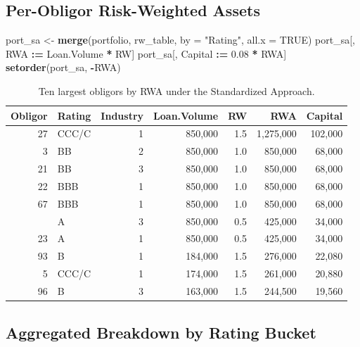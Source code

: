 \documentclass[
  11pt,
]{article}
\newenvironment{Shaded}{\begin{snugshade}}{\end{snugshade}}
\newcommand{\AttributeTok}[1]{\textcolor[rgb]{0.13,0.29,0.53}{#1}}
\newcommand{\ConstantTok}[1]{\textcolor[rgb]{0.56,0.35,0.01}{#1}}
\newcommand{\FloatTok}[1]{\textcolor[rgb]{0.00,0.00,0.81}{#1}}
\newcommand{\FunctionTok}[1]{\textcolor[rgb]{0.13,0.29,0.53}{\textbf{#1}}}
\newcommand{\NormalTok}[1]{#1}
\newcommand{\OtherTok}[1]{\textcolor[rgb]{0.56,0.35,0.01}{#1}}
\newcommand{\SpecialCharTok}[1]{\textcolor[rgb]{0.81,0.36,0.00}{\textbf{#1}}}
\newcommand{\StringTok}[1]{\textcolor[rgb]{0.31,0.60,0.02}{#1}}
\begin{document}
\subsection{Per-Obligor Risk-Weighted
Assets}\label{per-obligor-risk-weighted-assets}

\begin{Shaded}
\begin{Highlighting}[]
\NormalTok{port\_sa }\OtherTok{\textless{}{-}} \FunctionTok{merge}\NormalTok{(portfolio, rw\_table, }\AttributeTok{by =} \StringTok{"Rating"}\NormalTok{, }\AttributeTok{all.x =} \ConstantTok{TRUE}\NormalTok{)}
\NormalTok{port\_sa[, RWA     }\SpecialCharTok{:=}\NormalTok{ Loan.Volume }\SpecialCharTok{*}\NormalTok{ RW]}
\NormalTok{port\_sa[, Capital }\SpecialCharTok{:=} \FloatTok{0.08} \SpecialCharTok{*}\NormalTok{ RWA]}
\FunctionTok{setorder}\NormalTok{(port\_sa, }\SpecialCharTok{{-}}\NormalTok{RWA)}
\end{Highlighting}
\end{Shaded}

\begin{longtable}[t]{rlrrrrr}
\caption{\label{tab:task2-top10}Ten largest obligors by RWA under the Standardized Approach.}\\
\toprule
Obligor & Rating & Industry & Loan.Volume & RW & RWA & Capital\\
\midrule
27 & CCC/C & 1 & 850,000 & 1.5 & 1,275,000 & 102,000\\
3 & BB & 2 & 850,000 & 1.0 & 850,000 & 68,000\\
21 & BB & 3 & 850,000 & 1.0 & 850,000 & 68,000\\
22 & BBB & 1 & 850,000 & 1.0 & 850,000 & 68,000\\
67 & BBB & 1 & 850,000 & 1.0 & 850,000 & 68,000\\
\addlinespace
13 & A & 3 & 850,000 & 0.5 & 425,000 & 34,000\\
23 & A & 1 & 850,000 & 0.5 & 425,000 & 34,000\\
93 & B & 1 & 184,000 & 1.5 & 276,000 & 22,080\\
5 & CCC/C & 1 & 174,000 & 1.5 & 261,000 & 20,880\\
96 & B & 3 & 163,000 & 1.5 & 244,500 & 19,560\\
\bottomrule
\end{longtable}

\subsection{Aggregated Breakdown by Rating
Bucket}\label{aggregated-breakdown-by-rating-bucket}
\end{document}
